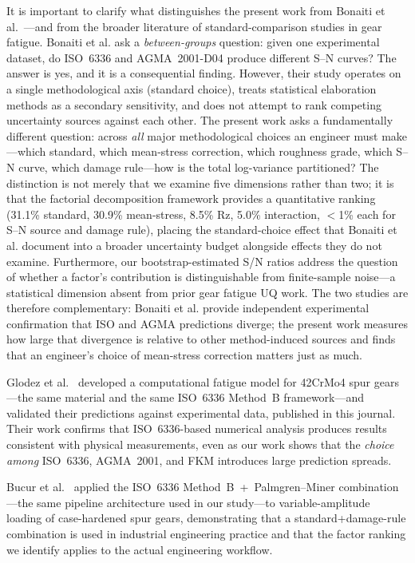 \documentclass[12pt,a4paper]{article}
\begin{document}
It is important to clarify what distinguishes the present work from
Bonaiti et al.~\cite{bonaiti2024}---and from the broader literature of
standard-comparison studies in gear fatigue. Bonaiti et al. ask a
\emph{between-groups} question: given one experimental dataset, do
ISO~6336 and AGMA~2001-D04 produce different S--N curves? The answer is
yes, and it is a consequential finding. However, their study operates
on a single methodological axis (standard choice), treats statistical
elaboration methods as a secondary sensitivity, and does not attempt
to rank competing uncertainty sources against each other. The present
work asks a fundamentally different question: across \emph{all} major
methodological choices an engineer must make---which standard, which
mean-stress correction, which roughness grade, which S--N curve, which
damage rule---how is the total log-variance partitioned? The distinction
is not merely that we examine five dimensions rather than two; it is
that the factorial decomposition framework provides a quantitative
ranking (31.1\% standard, 30.9\% mean-stress, 8.5\% Rz, 5.0\%
interaction, $<$1\% each for S--N source and damage rule), placing the
standard-choice effect that Bonaiti et al. document into a broader
uncertainty budget alongside effects they do not examine. Furthermore,
our bootstrap-estimated S/N ratios address the question of whether a
factor's contribution is distinguishable from finite-sample noise---a
statistical dimension absent from prior gear fatigue UQ work. The two
studies are therefore complementary: Bonaiti et al. provide independent
experimental confirmation that ISO and AGMA predictions diverge; the
present work measures how large that divergence is relative to other
method-induced sources and finds that an engineer's choice of mean-stress
correction matters just as much.

Glodez et al.~\cite{glodez2002} developed a computational fatigue
model for 42CrMo4 spur gears---the same material and the same
ISO~6336 Method~B framework---and validated their predictions against
experimental data, published in this journal. Their work confirms that
ISO~6336-based numerical analysis produces results consistent with
physical measurements, even as our work shows that the \emph{choice
among} ISO~6336, AGMA~2001, and FKM introduces large prediction spreads.

Bucur et al.~\cite{bucur2022} applied the ISO~6336 Method~B~+~Palmgren--Miner
combination---the same pipeline architecture used in our study---to
variable-amplitude loading of case-hardened spur gears, demonstrating that
a standard+damage-rule combination is used in industrial engineering practice
and that the factor ranking we identify applies to the actual engineering
workflow.
\end{document}
